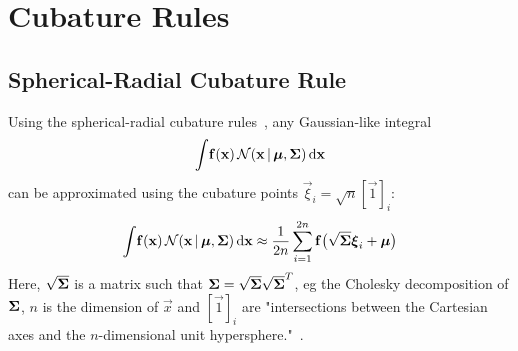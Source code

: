 \section{Cubature Rules}



\subsection{Spherical-Radial Cubature Rule}
	Using the spherical-radial cubature rules~\cite{solinCubatureIntegrationMethods2010}, any Gaussian-like integral
	\begin{equation*}
		\int\! \boldsymbol{\mathrm{f}}(\boldsymbol{\mathrm{x}}) \,\mathcal{N}(\boldsymbol{\mathrm{x}} \,\vert\, \boldsymbol{\mathrm{\mu}}, \boldsymbol{\mathrm{\Sigma}}) \dd{\boldsymbol{\mathrm{x}}}
	\end{equation*}
	can be approximated using the cubature points \( \vec{\xi}_i = \sqrt{n} [\vec{1}]_i \):
	\begin{equation}
		\int\! \boldsymbol{\mathrm{f}}(\boldsymbol{\mathrm{x}}) \,\mathcal{N}(\boldsymbol{\mathrm{x}} \,\vert\, \boldsymbol{\mathrm{\mu}}, \boldsymbol{\mathrm{\Sigma}}) \dd{\boldsymbol{\mathrm{x}}} \approx \frac{1}{2n} \sum_{i = 1}^{2n} \boldsymbol{\mathrm{f}}\big( \sqrt{\boldsymbol{\mathrm{\Sigma}}} \boldsymbol{\mathrm{\xi}}_i + \boldsymbol{\mathrm{\mu}} \big)  \label{eq:sphericalRadialGaussianCubatureRule}
	\end{equation}
	Here, \( \sqrt{\boldsymbol{\mathrm{\Sigma}}} \) is a matrix such that \( \boldsymbol{\mathrm{\Sigma}} = \sqrt{\boldsymbol{\mathrm{\Sigma}}} \sqrt{\boldsymbol{\mathrm{\Sigma}}}^T \), \ac{eg} the Cholesky decomposition of \(\boldsymbol{\mathrm{\Sigma}}\), \(n\) is the dimension of \(\vec{x}\) and \( [\vec{1}]_i \) are "intersections between the Cartesian axes and the \(n\)-dimensional unit hypersphere."~\cite{solinCubatureIntegrationMethods2010}.
